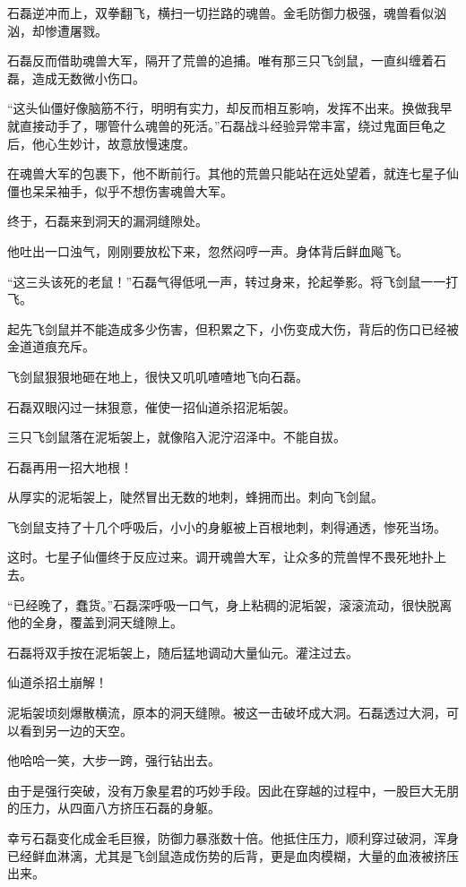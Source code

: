 \begin{this_body}
石磊逆冲而上，双拳翻飞，横扫一切拦路的魂兽。金毛防御力极强，魂兽看似汹汹，却惨遭屠戮。

石磊反而借助魂兽大军，隔开了荒兽的追捕。唯有那三只飞剑鼠，一直纠缠着石磊，造成无数微小伤口。

“这头仙僵好像脑筋不行，明明有实力，却反而相互影响，发挥不出来。换做我早就直接动手了，哪管什么魂兽的死活。”石磊战斗经验异常丰富，绕过鬼面巨龟之后，他心生妙计，故意放慢速度。

在魂兽大军的包裹下，他不断前行。其他的荒兽只能站在远处望着，就连七星子仙僵也呆呆袖手，似乎不想伤害魂兽大军。

终于，石磊来到洞天的漏洞缝隙处。

他吐出一口浊气，刚刚要放松下来，忽然闷哼一声。身体背后鲜血飚飞。

“这三头该死的老鼠！”石磊气得低吼一声，转过身来，抡起拳影。将飞剑鼠一一打飞。

起先飞剑鼠并不能造成多少伤害，但积累之下，小伤变成大伤，背后的伤口已经被金道道痕充斥。

飞剑鼠狠狠地砸在地上，很快又叽叽喳喳地飞向石磊。

石磊双眼闪过一抹狠意，催使一招仙道杀招泥垢袈。

三只飞剑鼠落在泥垢袈上，就像陷入泥泞沼泽中。不能自拔。

石磊再用一招大地根！

从厚实的泥垢袈上，陡然冒出无数的地刺，蜂拥而出。刺向飞剑鼠。

飞剑鼠支持了十几个呼吸后，小小的身躯被上百根地刺，刺得通透，惨死当场。

这时。七星子仙僵终于反应过来。调开魂兽大军，让众多的荒兽悍不畏死地扑上去。

“已经晚了，蠢货。”石磊深呼吸一口气，身上粘稠的泥垢袈，滚滚流动，很快脱离他的全身，覆盖到洞天缝隙上。

石磊将双手按在泥垢袈上，随后猛地调动大量仙元。灌注过去。

仙道杀招土崩解！

泥垢袈顷刻爆散横流，原本的洞天缝隙。被这一击破坏成大洞。石磊透过大洞，可以看到另一边的天空。

他哈哈一笑，大步一跨，强行钻出去。

由于是强行突破，没有万象星君的巧妙手段。因此在穿越的过程中，一股巨大无朋的压力，从四面八方挤压石磊的身躯。

幸亏石磊变化成金毛巨猴，防御力暴涨数十倍。他抵住压力，顺利穿过破洞，浑身已经鲜血淋漓，尤其是飞剑鼠造成伤势的后背，更是血肉模糊，大量的血液被挤压出来。


\end{this_body}

